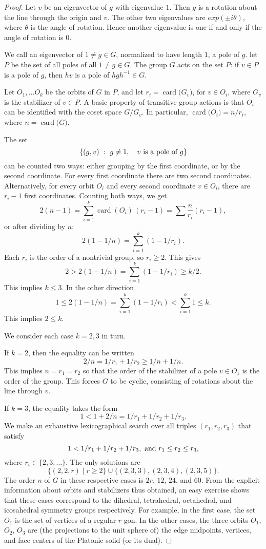 \documentclass{amsart}
\def\card#1{\op{card}{#1}}
\def\op#1{{\operatorname{#1}}}
\begin{document}
\begin{proof}
  Let $v$ be an eigenvector
of $g$ with eigenvalue $1$.  Then $g$ is a rotation about the line through the origin and $v$.  The other
two eigenvalues are $exp(\pm i \theta)$, where $\theta$ is the angle of rotation.  Hence another eigenvalue
is one if and only if the angle of rotation is $0$.

We call an eigenvector of $1\ne g\in G$, normalized to have length $1$, a pole of $g$.  let $P$ be the
set of all poles of all $1\ne g\in G$.  
The group $G$ acts on the set $P$: if $v\in P$ is a pole of $g$, then $h v$ is a pole of $h g h^{-1}\in G$.

Let $O_1,\ldots O_k$ be the orbits of $G$ in $P$, and let $r_i=\card(G_v)$, for $v\in O_i$,
where $G_v$ is the stabilizer of $v\in P$.
A basic property
of transitive group actions is that $O_i$ can be identified with the coset space $G/G_v$.
In particular, $\card(O_i) = n/r_i$, where $n=\card(G)$.

The set
\[
\{(g,v)\mid g\ne 1,\quad v \hbox{ is a pole of } g\}
\]
can be counted two ways: either grouping by the first coordinate, or by the second coordinate.
For every first coordinate there are two second coordinates.  Alternatively,
for every orbit $O_i$ and every second coordinate $v\in O_i$, there
are $r_i - 1$ first coordinates.  Counting both ways, we get
\[
2 (n-1) = \sum_{i=1}^k \card{(O_i)}\, (r_i - 1) =  \sum \frac{n}{r_i}(r_i-1),
\]
or after dividing by $n$:
\[
2 (1 - 1/n) = \sum_{i=1}^k (1-1/r_i).
\]
Each $r_i$ is the order of a nontrivial group, so $r_i\ge2$.
This gives
\[
2 > 2 (1-1/n) =\sum_{i=1}^k (1-1/r_i) \ge k/2.
\]
This implies $k\le 3$.  
In the other direction
\[
1 \le 2(1-1/n) = \sum_{i=1}^k (1-1/r_i) < \sum_{i=1}^k 1 \le k.
\]
This implies $2\le k$.

We consider each case $k=2,3$ in turn.

If $k=2$, then the equality can be written
\[
2/n = 1/r_1 + 1/r_2 \ge 1/n + 1/n.
\]
This implies $n=r_1 = r_2$ so that the order of the stabilizer of a
pole $v\in O_1$ is the order of the group.  This forces $G$ to be
cyclic, consisting of rotations about the line through $v$.

If $k=3$, the equality takes the form
\[
1< 1 + 2/n = 1/r_1 + 1/r_2 + 1/r_3.
\]
We make an exhaustive lexicographical search over all triples
$(r_1,r_2,r_3)$ that satisfy
\[
1 < 1/r_1 + 1/r_2 + 1/r_3, \hbox{ and } r_1 \le r_2 \le r_3,
\]
where $r_i \in \{2,3,\ldots\}$.
The only solutions are 
\[
\{ (2,2,r)\mid r\ge 2\} \cup \{(2,3,3),(2,3,4),(2,3,5)\}.
\]
The order $n$ of $G$ in these respective cases is $2r$, $12$, $24$,
and $60$.  From the explicit information about orbits and stabilizers
thus obtained, an easy exercise shows that these cases correspond to
the dihedral, tetrahedral, octahedral, and icosahedral symmetry groups
respectively.  For example, in the first case, the set $O_1$ is the
set of vertices of a regular $r$-gon. In the other cases, the three
orbits $O_1$, $O_2$, $O_3$ are (the projections to the unit sphere of)
the edge midpoints, vertices, and face centers of the Platonic
solid (or its dual).
\end{proof}
\end{document}
